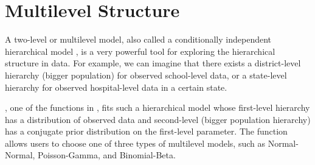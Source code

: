\documentclass[article]{jss}
\begin{document}

\section[Multilevel Structure]{Multilevel Structure} \label{multilevel}
A two-level or multilevel model, also called a conditionally independent hierarchical model \citep{1989}, is a very powerful tool for exploring the hierarchical structure in data. For example, we can imagine that there exists a district-level hierarchy (bigger population) for observed school-level data, or a state-level hierarchy for observed hospital-level data in a certain state. 

, one of the functions in , fits such a hierarchical model whose first-level hierarchy has a distribution of observed data and second-level (bigger population hierarchy) has a conjugate prior distribution on the first-level parameter. The  function allows users to choose one of three types of multilevel models, such as Normal-Normal, Poisson-Gamma, and Binomial-Beta. 
 
\end{document}
